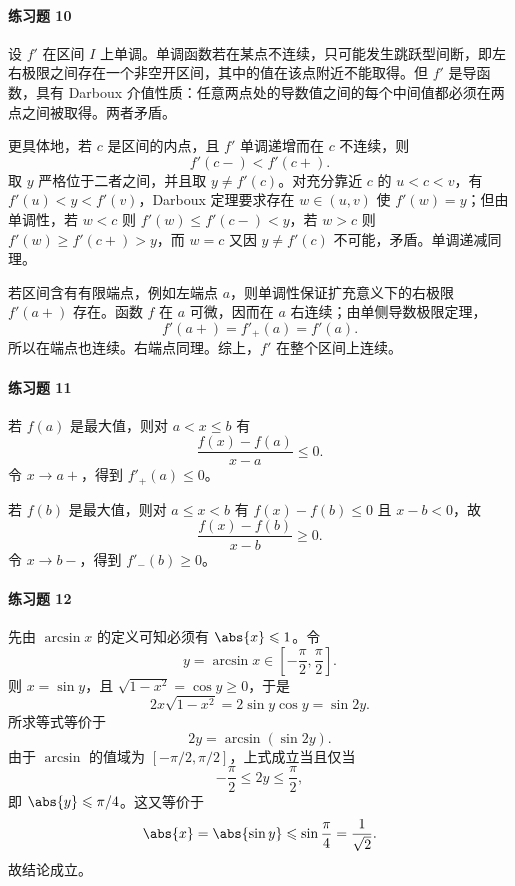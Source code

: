 \paragraph{练习题 10}
\begin{xsolution}
设 $f'$ 在区间 $I$ 上单调。单调函数若在某点不连续，只可能发生跳跃型间断，即左右极限之间存在一个非空开区间，其中的值在该点附近不能取得。但 $f'$ 是导函数，具有 Darboux 介值性质：任意两点处的导数值之间的每个中间值都必须在两点之间被取得。两者矛盾。

更具体地，若 $c$ 是区间的内点，且 $f'$ 单调递增而在 $c$ 不连续，则
\[
  f'(c-)<f'(c+).
\]
取 $y$ 严格位于二者之间，并且取 $y\neq f'(c)$。对充分靠近 $c$ 的 $u<c<v$，有 $f'(u)<y<f'(v)$，Darboux 定理要求存在 $w\in(u,v)$ 使 $f'(w)=y$；但由单调性，若 $w<c$ 则 $f'(w)\leqslant f'(c-)<y$，若 $w>c$ 则 $f'(w)\geqslant f'(c+)>y$，而 $w=c$ 又因 $y\neq f'(c)$ 不可能，矛盾。单调递减同理。

若区间含有有限端点，例如左端点 $a$，则单调性保证扩充意义下的右极限 $f'(a+)$ 存在。函数 $f$ 在 $a$ 可微，因而在 $a$ 右连续；由单侧导数极限定理，
\[
  f'(a+)=f'_+(a)=f'(a).
\]
所以在端点也连续。右端点同理。综上，$f'$ 在整个区间上连续。
\end{xsolution}

\paragraph{练习题 11}
\begin{xsolution}
若 $f(a)$ 是最大值，则对 $a<x\leqslant b$ 有
\[
  \frac{f(x)-f(a)}{x-a}\leqslant0.
\]
令 $x\to a+$，得到 $f'_+(a)\leqslant0$。

若 $f(b)$ 是最大值，则对 $a\leqslant x<b$ 有 $f(x)-f(b)\leqslant0$ 且 $x-b<0$，故
\[
  \frac{f(x)-f(b)}{x-b}\geqslant0.
\]
令 $x\to b-$，得到 $f'_-(b)\geqslant0$。
\end{xsolution}

\paragraph{练习题 12}
\begin{xsolution}
先由 $\arcsin x$ 的定义可知必须有 $\abs{x}\leqslant1$。令
\[
  y=\arcsin x\in\left[-\frac\pi2,\frac\pi2\right].
\]
则 $x=\sin y$，且 $\sqrt{1-x^2}=\cos y\geqslant0$，于是
\[
  2x\sqrt{1-x^2}=2\sin y\cos y=\sin2y.
\]
所求等式等价于
\[
  2y=\arcsin(\sin2y).
\]
由于 $\arcsin$ 的值域为 $[-\pi/2,\pi/2]$，上式成立当且仅当
\[
  -\frac\pi2\leqslant2y\leqslant\frac\pi2,
\]
即 $\abs{y}\leqslant\pi/4$。这又等价于
\[
  \abs{x}=\abs{\sin y}\leqslant\sin\frac\pi4=\frac1{\sqrt2}.
\]
故结论成立。
\end{xsolution}

